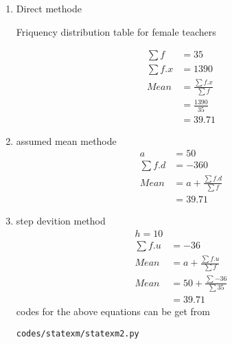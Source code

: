 \renewcommand{\theequation}{\theenumi}
\begin{enumerate}[label=\arabic*.,ref=\thesubsection.\theenumi]
\item Direct methode
\begin{table}[!ht]
	\centering
	
\end{table}
\begin{table}[!ht]
	\centering
	
	\caption{Friquency distribution table for female teachers}
	\end{table}
\begin{align}
\sum{f} &= 35
\\
\sum{f.x} &= 1390
\\
Mean &= \frac{\sum{f.x}}{\sum{f}}
\\
&= \frac{1390}{35}
\\
&= 39.71
\end{align}
\item assumed mean methode
\begin{align}
a &= 50
\\
\sum{f.d} &= -360
\\
Mean &= a + \frac{\sum{f.d}}{\sum{f}}
\\
&= 39.71
\end{align}
\item step devition method
\begin{align}
h= 10
\\
\sum{f.u} &= -36
\\
Mean &= a + \frac{\sum{f.u}}{\sum{f}}
\\
Mean &= 50 + \frac{\sum{-36}}{\sum{35}}
\\
&=39.71
\end{align}
codes for the above equations can be get from
\begin{lstlisting}
codes/statexm/statexm2.py
\end{lstlisting}
\end{enumerate}